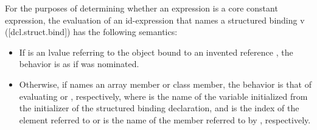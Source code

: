 \documentclass{wg21}
\begin{document}

\begin{addedblock}
For the purposes of determining whether an expression is a core constant expression, the
evaluation of an id-expression that names a structured binding v ([dcl.struct.bind]) has the
following semantics:
\begin{itemize}
\item If  is an lvalue referring to the object bound to an invented reference , the
behavior is as if  was nominated.
\item Otherwise, if  names an array member or class member, the behavior is that of
evaluating  or , respectively, where  is the name of the variable initialized
from the initializer of the structured binding declaration, and  is the index of the
element referred to or  is the name of the member referred to by , respectively.
\end{itemize}
\end{addedblock}

\end{document}
